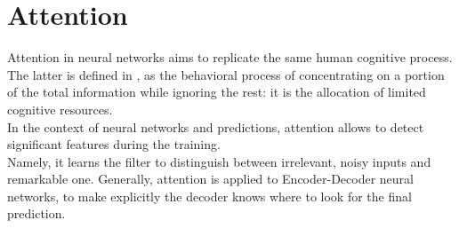 \documentclass[LaM,binding=0.6cm]{sapthesis}
\begin{document}
\section{Attention}
Attention in neural networks aims to replicate the same human cognitive process. The latter is defined in \cite{psy}, as the behavioral process of concentrating on a portion of the total information while ignoring the rest: it is the allocation of limited cognitive resources.\\In the context of neural networks and predictions, attention allows to detect significant features during the training.\\Namely, it learns the filter to distinguish  between irrelevant, noisy inputs and remarkable one. Generally, attention is applied to Encoder-Decoder neural networks, to make explicitly the decoder knows where to look for the final prediction.
\end{document}
